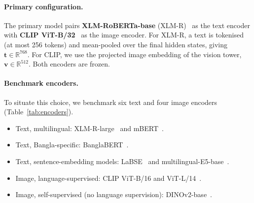 \paragraph{Primary configuration.}
The primary model pairs \textbf{XLM-RoBERTa-base} (XLM-R)~\cite{conneau2020xlmr} as the text encoder with
\textbf{CLIP ViT-B/32}~\cite{radford2021clip} as the image encoder. For XLM-R, a text is tokenised (at most 256
tokens) and mean-pooled over the final hidden states, giving $\mathbf{t}\in\mathbb{R}^{768}$. For CLIP, we use the
projected image embedding of the vision tower, $\mathbf{v}\in\mathbb{R}^{512}$. Both encoders are frozen.

\paragraph{Benchmark encoders.}
To situate this choice, we benchmark six text and four image encoders (Table~\ref{tab:encoders}).
\begin{itemize}
  \item Text, multilingual: XLM-R-large~\cite{conneau2020xlmr} and mBERT~\cite{devlin2019bert}.
  \item Text, Bangla-specific: BanglaBERT~\cite{bhattacharjee2022banglabert}.
  \item Text, sentence-embedding models: LaBSE~\cite{feng2022labse} and multilingual-E5-base~\cite{wang2024me5}.
  \item Image, language-supervised: CLIP ViT-B/16 and ViT-L/14~\cite{radford2021clip}.
  \item Image, self-supervised (no language supervision): DINOv2-base~\cite{oquab2024dinov2}.
\end{itemize}

